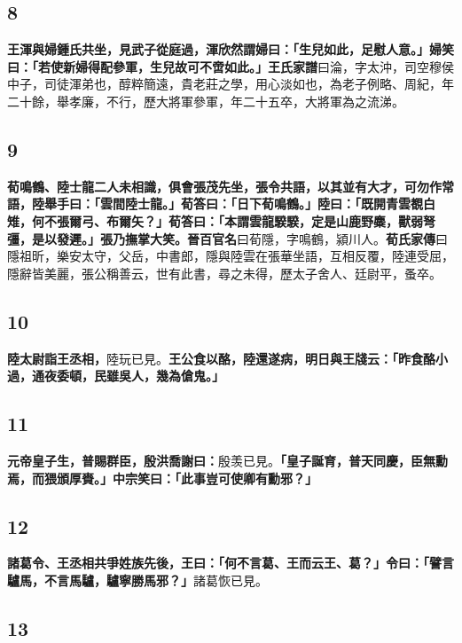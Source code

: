 \subsection*{8}

\textbf{王渾與婦鍾氏共坐，見武子從庭過，渾欣然謂婦曰：「生兒如此，足慰人意。」婦笑曰：「若使新婦得配參軍，生兒故可不啻如此。」}{\footnotesize \textbf{王氏家譜}曰淪，字太沖，司空穆侯中子，司徒渾弟也，醇粹簡遠，貴老莊之學，用心淡如也，為老子例略、周紀，年二十餘，舉孝廉，不行，歷大將軍參軍，年二十五卒，大將軍為之流涕。}

\subsection*{9}

\textbf{荀鳴鶴、陸士龍二人未相識，俱會張茂先坐，張令共語，以其並有大才，可勿作常語，陸舉手曰：「雲間陸士龍。」荀答曰：「日下荀鳴鶴。」陸曰：「既開青雲覩白雉，何不張爾弓、布爾矢？」荀答曰：「本謂雲龍騤騤，定是山鹿野麋，獸弱弩彊，是以發遲。」張乃撫掌大笑。}{\footnotesize \textbf{晉百官名}曰荀隱，字鳴鶴，潁川人。\textbf{荀氏家傳}曰隱祖昕，樂安太守，父岳，中書郎，隱與陸雲在張華坐語，互相反覆，陸連受屈，隱辭皆美麗，張公稱善云，世有此書，尋之未得，歷太子舍人、廷尉平，蚤卒。}

\subsection*{10}

\textbf{陸太尉詣王丞相，}{\footnotesize 陸玩已見。}\textbf{王公食以酪，陸還遂病，明日與王牋云：「昨食酪小過，通夜委頓，民雖吳人，幾為傖鬼。」}

\subsection*{11}

\textbf{元帝皇子生，普賜群臣，殷洪喬謝曰：}{\footnotesize 殷羡已見。}\textbf{「皇子誕育，普天同慶，臣無勳焉，而猥頒厚賚。」中宗笑曰：「此事豈可使卿有勳邪？」}

\subsection*{12}

\textbf{諸葛令、王丞相共爭姓族先後，王曰：「何不言葛、王而云王、葛？」令曰：「譬言驢馬，不言馬驢，驢寧勝馬邪？」}{\footnotesize 諸葛恢已見。}

\subsection*{13}

